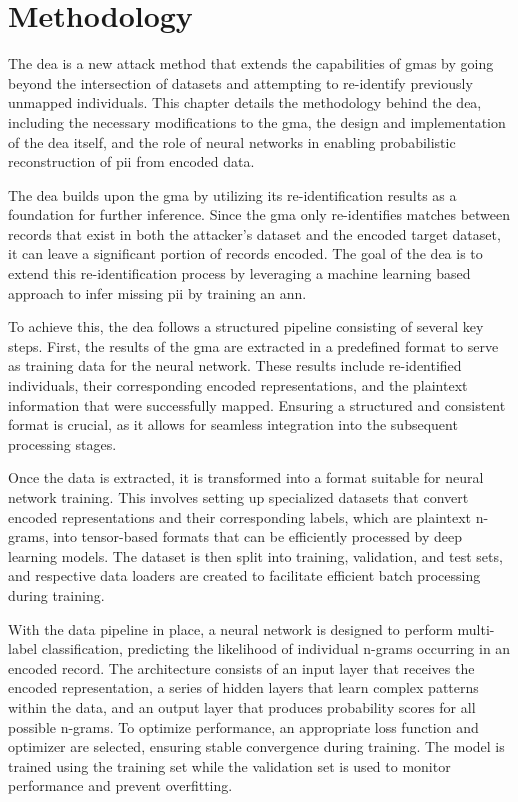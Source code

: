 \chapter{Methodology}  \label{sec:method}
The \ac{dea} is a new attack method that extends the capabilities of \ac{gma}s by going beyond the intersection of datasets and attempting to re-identify previously unmapped individuals.
This chapter details the methodology behind the \ac{dea}, including the necessary modifications to the \ac{gma}, the design and implementation of the \ac{dea} itself, and the role of neural networks in enabling probabilistic reconstruction of \ac{pii} from encoded data.

The \ac{dea} builds upon the \ac{gma} by utilizing its re-identification results as a foundation for further inference.
Since the \ac{gma} only re-identifies matches between records that exist in both the attacker’s dataset and the encoded target dataset, it can leave a significant portion of records encoded.
The goal of the \ac{dea} is to extend this re-identification process by leveraging a machine learning based approach to infer missing \ac{pii} by training an \ac{ann}.

To achieve this, the \ac{dea} follows a structured pipeline consisting of several key steps.
First, the results of the \ac{gma} are extracted in a predefined format to serve as training data for the neural network.
These results include re-identified individuals, their corresponding encoded representations, and the plaintext information that were successfully mapped.
Ensuring a structured and consistent format is crucial, as it allows for seamless integration into the subsequent processing stages.

Once the data is extracted, it is transformed into a format suitable for neural network training.
This involves setting up specialized datasets that convert encoded representations and their corresponding labels, which are plaintext n-grams, into tensor-based formats that can be efficiently processed by deep learning models.
The dataset is then split into training, validation, and test sets, and respective data loaders are created to facilitate efficient batch processing during training.

With the data pipeline in place, a neural network is designed to perform multi-label classification, predicting the likelihood of individual n-grams occurring in an encoded record.
The architecture consists of an input layer that receives the encoded representation, a series of hidden layers that learn complex patterns within the data, and an output layer that produces probability scores for all possible n-grams.
To optimize performance, an appropriate loss function and optimizer are selected, ensuring stable convergence during training.
The model is trained using the training set while the validation set is used to monitor performance and prevent overfitting.

